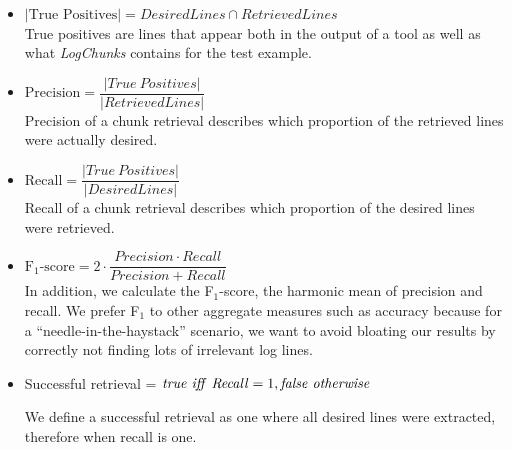 \vspace{0.2cm}
\begin{itemize}[leftmargin=0.4cm] \itemsep1em
	\item $|\mbox{True\ Positives}| = \mathit{DesiredLines} \cap
	\mathit{RetrievedLines}$ \vspace{0.2cm}\\
	True positives are lines that appear both in the output of a
	tool as well as what \textit{LogChunks} contains for the
  test example.


	\item $\mbox{Precision} = \dfrac{|\mathit{True\
	Positives}|}{|\mathit{RetrievedLines}|}$ \vspace{0.21cm} \\
	Precision of a chunk retrieval describes which proportion of
	the retrieved lines were actually desired.

	\item $\mbox{Recall} =
	\dfrac{|\mathit{True\ Positives}|}{|\mathit{DesiredLines}|}$
	\vspace{0.2cm} \\
	Recall of a chunk retrieval describes which proportion of the
	desired lines were retrieved.

	\item $\mbox{F$_{1}$-score} = 2 \cdot \dfrac{\mathit{Precision}
	\cdot \mathit{Recall}}{\mathit{Precision} + \mathit{Recall}}$
	\vspace{0.2cm}\\
	In addition, we calculate the F$_{1}$-score, the harmonic mean
	of precision and recall.
  We prefer F$_{1}$ to other aggregate
	measures such as accuracy because for a
	``needle-in-the-haystack'' scenario, we want to avoid bloating
	our results by correctly not finding lots of irrelevant log
	lines.

	\item Successful retrieval = $\mathit{true}\ \mathit{iff}\
	\mathit{Recall} = 1, \mathit{false\ otherwise}\vspace{0.1cm}$

	We define a successful retrieval as one where all desired
	lines were
	extracted, therefore when recall is one.
\end{itemize}

